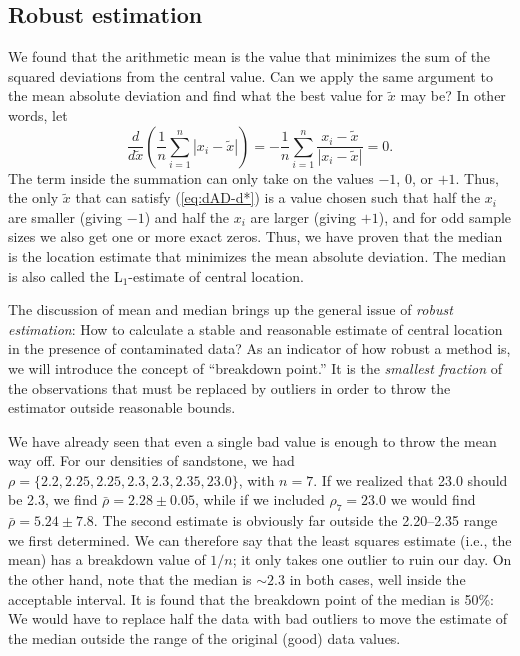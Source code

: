 \subsection{Robust estimation}
\label{sec:zscore}

	We found that the arithmetic mean is the value that minimizes the sum of the squared deviations from the 
central value.  Can we apply the same argument to the mean absolute deviation and find what the 
best value for  $\tilde{x}$ may be?  In other words, let
\begin{equation}
\frac{d}{d\tilde{x}} \left( \frac{1}{n}\displaystyle \sum^n_{i=1} \left |x_i - \tilde{x}\right | \right) = -\frac{1}{n} \sum^n_{i=1} \frac{x_i - \tilde{x}}{|x_i - \tilde{x}|} = 0.
\label{eq:dAD-d*}
\end{equation}
The term inside the summation can only take on the values $-1$, $0$, or $+1$.  Thus, the only $\tilde{x}$  that can 
satisfy (\ref{eq:dAD-d*}) is a value chosen such that half the $x_i$ are smaller (giving $-1$) and half the $x_i$ are 
larger (giving $+1$), and for odd sample sizes we also get one or more exact zeros.  Thus, we
have proven that the median is the location estimate that minimizes 
the mean absolute deviation.  The 
median is also called the L$_1$-estimate of central location.

	The discussion of mean and median brings up the general issue of \emph{robust estimation}: How to 
calculate a stable and reasonable estimate of central location in the presence of contaminated 
data?  As an indicator of how robust a method is, we will introduce the concept of ``breakdown 
point.''  It is the \emph{smallest fraction} of the observations that must be replaced by outliers in order to throw 
the estimator outside reasonable bounds.  

	We have already seen that even a single bad value is enough to throw the mean way off.  For our 
densities of sandstone, we had $\rho = \{2.2, 2.25, 2.25, 2.3, 2.3, 2.35, 23.0\}$, with $n = 7$.  If we 
realized that 23.0 should be 2.3, we find $\bar{\rho} = 2.28 \pm 0.05$, while if we included $\rho_7 = 23.0$ we 
would find $\bar{\rho} = 5.24 \pm 7.8$.  The second estimate is obviously far outside the 2.20--2.35 range we first 
determined.  We can therefore say that the least squares estimate (i.e., the mean) has a breakdown value of 
$1/n$; it only takes one outlier to ruin our day.  On the other hand, note that the median is $\sim 2.3$ in 
both cases, well inside the acceptable interval.  It is found that the breakdown point of the 
median is 
50\%:  We would have to replace half the data with bad outliers to move the estimate of 
the median outside the range of the original (good) data values.

